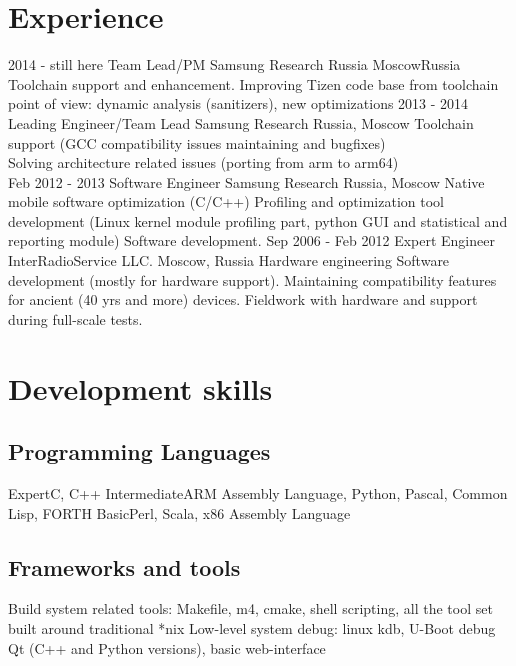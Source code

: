 \documentclass[11pt,a4paper]{moderncv}
\begin{document}
\section{Experience}
\cventry
  {2014 - still here}
  {Team Lead/PM}
  {Samsung Research Russia}
  {Moscow}{Russia}
  {Toolchain support and enhancement. Improving Tizen code base from toolchain point of view: dynamic analysis
    (sanitizers), new optimizations}
\cventry
  {2013 - 2014}
  {Leading Engineer/Team Lead}
  {Samsung Research Russia, Moscow}
  {}{}
  {Toolchain support (GCC compatibility issues maintaining and bugfixes)\\
Solving architecture related issues (porting from arm to arm64)\\}
\cventry
  {Feb 2012 - 2013}
  {Software Engineer}
  {Samsung Research Russia, Moscow}
  {}{}
  {Native mobile software optimization (C/C++)\newline{}
Profiling and optimization tool development (Linux kernel module profiling part, python GUI and statistical and reporting module)\newline{}
Software development.}
\cventry
  {Sep 2006 - Feb 2012}
  {Expert Engineer}
  {InterRadioService LLC. Moscow, Russia}
  {}{}
  {Hardware engineering\newline{}
Software development (mostly for hardware support).\newline{}
Maintaining compatibility features for ancient (40 yrs and more) devices.\newline{}
Fieldwork with hardware and support during full-scale tests.\newline{}}

\section{Development skills}
\subsection{Programming Languages}
\cvitem
  {Expert}{C, C++}
\cvitem
  {Intermediate}{ARM Assembly Language, Python, Pascal, Common Lisp, FORTH}
\cvitem
  {Basic}{Perl, Scala, x86 Assembly Language}

\subsection{Frameworks and tools}
{Build system related tools: Makefile, m4, cmake, shell scripting, all the tool set built around traditional *nix}
{Low-level system debug: linux kdb, U-Boot debug}
{Qt (C++ and Python versions), basic web-interface}
\end{document}

